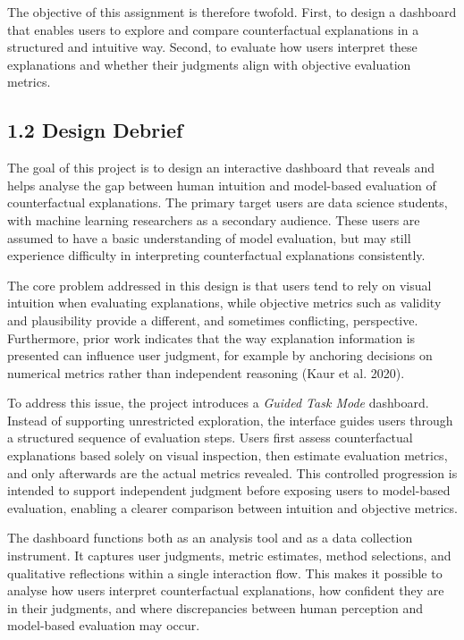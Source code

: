 \documentclass[
  letterpaper,
  DIV=11,
  numbers=noendperiod]{scrartcl}
\begin{document}
The objective of this assignment is therefore twofold. First, to design
a dashboard that enables users to explore and compare counterfactual
explanations in a structured and intuitive way. Second, to evaluate how
users interpret these explanations and whether their judgments align
with objective evaluation metrics.

\subsection{1.2 Design Debrief}\label{design-debrief}

The goal of this project is to design an interactive dashboard that
reveals and helps analyse the gap between human intuition and
model-based evaluation of counterfactual explanations. The primary
target users are data science students, with machine learning
researchers as a secondary audience. These users are assumed to have a
basic understanding of model evaluation, but may still experience
difficulty in interpreting counterfactual explanations consistently.

The core problem addressed in this design is that users tend to rely on
visual intuition when evaluating explanations, while objective metrics
such as validity and plausibility provide a different, and sometimes
conflicting, perspective. Furthermore, prior work indicates that the way
explanation information is presented can influence user judgment, for
example by anchoring decisions on numerical metrics rather than
independent reasoning (Kaur et al. 2020).

To address this issue, the project introduces a \emph{Guided Task Mode}
dashboard. Instead of supporting unrestricted exploration, the interface
guides users through a structured sequence of evaluation steps. Users
first assess counterfactual explanations based solely on visual
inspection, then estimate evaluation metrics, and only afterwards are
the actual metrics revealed. This controlled progression is intended to
support independent judgment before exposing users to model-based
evaluation, enabling a clearer comparison between intuition and
objective metrics.

The dashboard functions both as an analysis tool and as a data
collection instrument. It captures user judgments, metric estimates,
method selections, and qualitative reflections within a single
interaction flow. This makes it possible to analyse how users interpret
counterfactual explanations, how confident they are in their judgments,
and where discrepancies between human perception and model-based
evaluation may occur.
\end{document}

